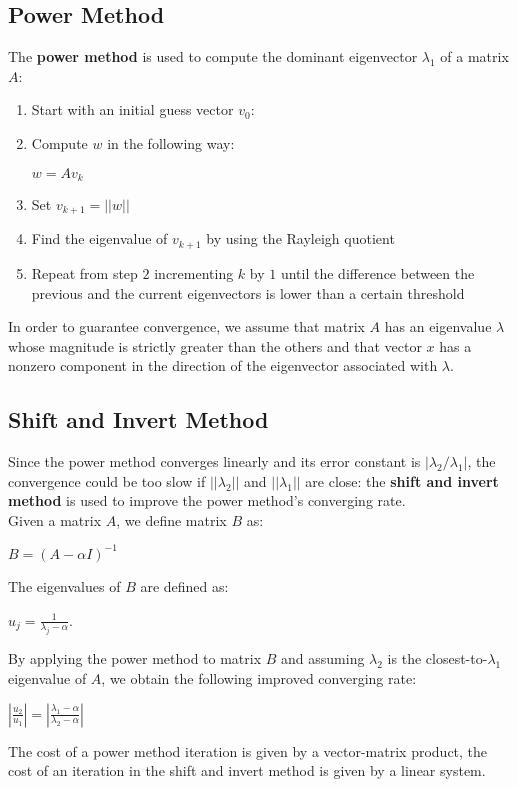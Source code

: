 \documentclass{article}
\begin{document}
\subsection{Power Method}
The \textbf{power method} is used to compute the dominant eigenvector $\lambda_1$ of a matrix $A$:
\begin{enumerate}
    \item Start with an initial guess vector $v_0$:
    \item Compute $w$ in the following way:
    \begin{center}
        $w = Av_k$
    \end{center}
    \item Set $v_{k+1} = ||w||$
    \item Find the eigenvalue of $v_{k+1}$ by using the Rayleigh quotient
    \item Repeat from step $2$ incrementing $k$ by $1$ until the difference between the previous and the current eigenvectors is lower than a certain threshold
\end{enumerate}
In order to guarantee convergence, we assume that matrix $A$ has an eigenvalue $\lambda$ whose magnitude is strictly greater than the others and that vector $x$ has a nonzero component in the direction of the eigenvector associated with $\lambda$.
\subsection{Shift and Invert Method}
Since the power method converges linearly and its error constant is $|\lambda_2 / \lambda_1|$, the convergence could be too slow if $||\lambda_2||$ and $||\lambda_1||$ are close: the \textbf{shift and invert method} is used to improve the power method's converging rate. \\
Given a matrix $A$, we define matrix $B$ as:
\begin{center}
    $B = (A - \alpha I)^{-1}$
\end{center}
The eigenvalues of $B$ are defined as:
\begin{center}
    $u_j = \displaystyle\frac{1}{\lambda_j - \alpha}$.
\end{center}
By applying the power method to matrix $B$ and assuming $\lambda_2$ is the closest-to-$\lambda_1$ eigenvalue of $A$, we obtain the following improved converging rate:
\begin{center}
    $|\displaystyle\frac{u_2}{u_1}| = |\displaystyle\frac{\lambda_1 - \alpha}{\lambda_2 - \alpha}|$
\end{center}
The cost of a power method iteration is given by a vector-matrix product, the cost of an iteration in the shift and invert method is given by a linear system.
\end{document}
